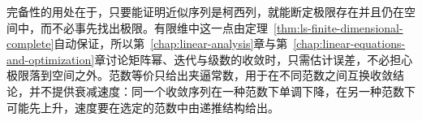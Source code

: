 完备性的用处在于，只要能证明近似序列是柯西列，就能断定极限存在并且仍在空间中，而不必事先找出极限。有限维中这一点由定理~\ref{thm:ls-finite-dimensional-complete}自动保证，所以第~\ref{chap:linear-analysis}章与第~\ref{chap:linear-equations-and-optimization}章讨论矩阵幂、迭代与级数的收敛时，只需估计误差，不必担心极限落到空间之外。范数等价只给出夹逼常数，用于在不同范数之间互换收敛结论，并不提供衰减速度：同一个收敛序列在一种范数下单调下降，在另一种范数下可能先上升，速度要在选定的范数中由递推结构给出。
